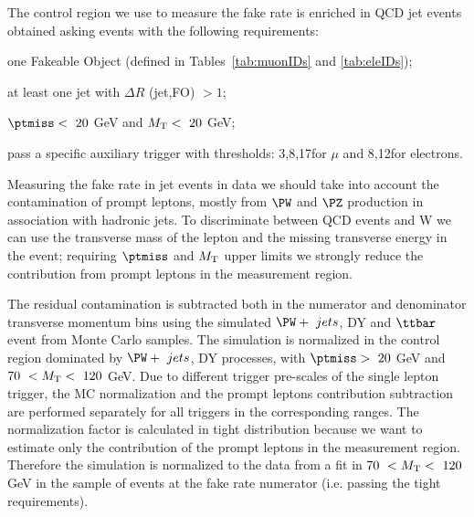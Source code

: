 The control region we use to measure the fake rate is enriched in QCD jet events obtained asking events with the following requirements:
\begin{itemize}
  {\footnotesize
	\item one Fakeable Object (defined in Tables~\ref{tab:muonIDs} and \ref{tab:eleIDs});
	\item at least one jet with $\Delta R$ (jet,FO) $>1$;
	\item $\ptmiss < \ 20$ GeV and $M_{\mathrm{T}} < \ 20 $ GeV;
	\item pass a specific auxiliary trigger with \pt thresholds:
          3,8,17\GeV for $\mu$ and 8,12\GeV for electrons.}
\end{itemize}

Measuring the fake rate in jet events in data we should take into account the contamination of prompt leptons, mostly from $\PW$ and $\PZ$ production in association with hadronic jets. To discriminate between QCD events and W we can use the transverse mass of the lepton and the missing transverse energy in the event; requiring $\ptmiss$ and $M_{\mathrm{T}}$ upper limits we strongly reduce the contribution from prompt leptons in the measurement region. 

The residual contamination is subtracted both in the numerator and denominator transverse momentum bins using the simulated $\PW + \ jets$, DY and $\ttbar$ event from Monte Carlo samples. The simulation is normalized in the control region dominated by $\PW + \ jets$, DY processes, with $\ptmiss > \ 20$ GeV and $70 \ < \MT < \ 120 $ GeV.
Due to different trigger pre-scales of the single lepton trigger, the
MC normalization and the prompt leptons contribution subtraction are
performed separately for all triggers in the corresponding \pt ranges.
The normalization factor is calculated in tight distribution because we want to estimate only the contribution of the prompt leptons in the measurement region. Therefore the simulation is normalized to the data from a fit in $70 \ < \MT < \ 120 $ GeV in the
sample of events at the fake rate numerator (i.e. passing the tight requirements).

